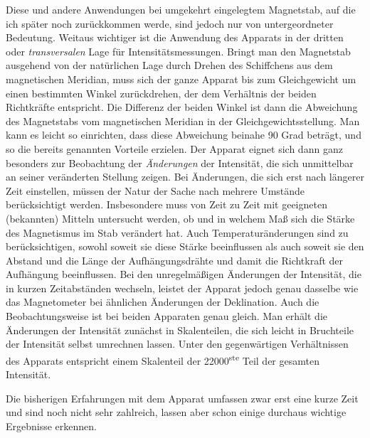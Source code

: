 Diese und andere Anwendungen bei umgekehrt eingelegtem Magnetstab, auf die ich später noch zurückkommen werde, sind jedoch nur von untergeordneter Bedeutung. Weitaus wichtiger ist die Anwendung des Apparats in der dritten oder \textit{transversalen} Lage für Intensitätsmessungen. Bringt man den Magnetstab ausgehend von der natürlichen Lage durch Drehen des Schiffchens aus dem magnetischen Meridian, muss sich der ganze Apparat bis zum Gleichgewicht um einen bestimmten Winkel zurückdrehen, der dem Verhältnis der beiden Richtkräfte entspricht. Die Differenz der beiden Winkel ist dann die Abweichung des Magnetstabs vom magnetischen Meridian in der Gleichgewichtsstellung. Man kann es leicht so einrichten, dass diese Abweichung beinahe 90 Grad beträgt, und so die bereits genannten Vorteile erzielen. Der Apparat eignet sich dann ganz besonders zur Beobachtung der \textit{Änderungen} der Intensität, die sich unmittelbar an seiner veränderten Stellung zeigen. Bei Änderungen, die sich erst nach längerer Zeit einstellen, müssen der Natur der Sache nach mehrere Umstände berücksichtigt werden. Insbesondere muss von Zeit zu Zeit mit geeigneten (bekannten) Mitteln untersucht werden, ob und in welchem Maß sich die Stärke des Magnetismus im Stab verändert hat. Auch Temperaturänderungen sind zu berücksichtigen, sowohl soweit sie diese Stärke beeinflussen als auch soweit sie den Abstand und die Länge der Aufhängungsdrähte und damit die Richtkraft der Aufhängung beeinflussen. Bei den unregelmäßigen Änderungen der Intensität, die in kurzen Zeitabständen wechseln, leistet der Apparat jedoch genau dasselbe wie das Magnetometer bei ähnlichen Änderungen der Deklination. Auch die Beobachtungsweise ist bei beiden Apparaten genau gleich. Man erhält die Änderungen der Intensität zunächst in Skalenteilen, die sich leicht in Bruchteile der Intensität selbst umrechnen lassen. Unter den gegenwärtigen Verhältnissen des Apparats entspricht einem Skalenteil der 22000\textsuperscript{ste} Teil der gesamten Intensität.

Die bisherigen Erfahrungen mit dem Apparat umfassen zwar erst eine kurze Zeit und sind noch nicht sehr zahlreich, lassen aber schon einige durchaus wichtige Ergebnisse erkennen.

